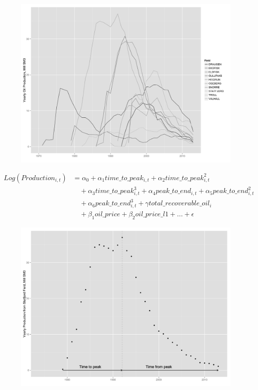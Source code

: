 \documentclass{beamer}
\begin{document}
\begin{frame}[plain]
	\begin{figure}
	\includegraphics[width=.8\textwidth]{top10_production.png}
	\caption{}
	\label{top10_production}	
	\end{figure}
\end{frame}







\begin{frame}[plain]
	\begin{equation}
		\begin{split}
		 Log(Production_{i,t}) & = \alpha_0 + \alpha_1 time\_to\_peak_{i,t} + \alpha_2 time\_to\_peak_{i,t}^2 \\
		& \quad + \alpha_3 time\_to\_peak_{i,t}^3  + \alpha_4 peak\_to\_end_{i,t} + \alpha_5 peak\_to\_end_{i,t}^2 \\
		& \quad + \alpha_6 peak\_to\_end_{i,t}^3 + \gamma total\_recoverable\_oil_i \\
		& \quad + \beta_1 oil\_price + \beta_2 oil\_price\_l1 + ...+ \epsilon
		\end{split}
	\label{glm_eqn}
		\end{equation}
\end{frame}


\begin{frame}[plain]
	\begin{figure}
	\includegraphics[width=.8\textwidth]{statfjord_dem.png}
	\caption{}
	\label{statfjord_dem}
	\end{figure}
\end{frame}
\end{document}
